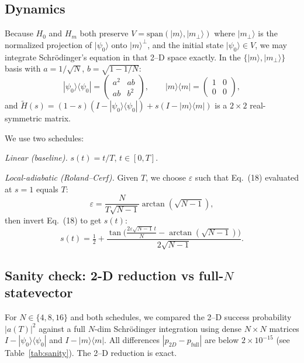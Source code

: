 \documentclass[11pt]{article}
\begin{document}
\subsection{Dynamics}

Because $H_0$ and $H_m$ both preserve $V=\mathrm{span}(|m\rangle,|m_\perp\rangle)$
where $|m_\perp\rangle$ is the normalized projection of $|\psi_0\rangle$ onto
$|m\rangle^\perp$, and the initial state $|\psi_0\rangle\in V$, we may integrate
Schr\"odinger's equation in that 2--D space exactly. In the
$\{|m\rangle,|m_\perp\rangle\}$ basis with $a=1/\sqrt N$, $b=\sqrt{1-1/N}$:
\[
  |\psi_0\rangle\langle\psi_0|=\begin{pmatrix}a^2 & ab\\ ab & b^2\end{pmatrix},\qquad
  |m\rangle\langle m|=\begin{pmatrix}1 & 0\\ 0 & 0\end{pmatrix},
\]
and $\tilde H(s)=(1-s)(I-|\psi_0\rangle\langle\psi_0|)+s(I-|m\rangle\langle m|)$
is a $2\times 2$ real-symmetric matrix.

We use two schedules:

\medskip
\emph{Linear (baseline).} $s(t)=t/T$, $t\in[0,T]$.

\medskip
\emph{Local-adiabatic (Roland--Cerf).} Given $T$, we choose $\varepsilon$
such that Eq.~(18) evaluated at $s=1$ equals $T$:
\[
  \varepsilon=\frac{N}{T\sqrt{N-1}}\arctan(\sqrt{N-1}),
\]
then invert Eq.~(18) to get $s(t)$:
\[
  s(t)=\tfrac{1}{2}+\frac{\tan\!\big(\tfrac{2\varepsilon\sqrt{N-1}\,t}{N}-\arctan(\sqrt{N-1})\big)}{2\sqrt{N-1}}.
\]

\subsection{Sanity check: 2-D reduction vs full-$N$ statevector}

For $N\in\{4,8,16\}$ and both schedules, we compared the 2--D success probability
$|a(T)|^2$ against a full $N$-dim Schr\"odinger integration using dense
$N\times N$ matrices $I-|\psi_0\rangle\langle\psi_0|$ and $I-|m\rangle\langle m|$.
All differences $|p_{2D}-p_{\text{full}}|$ are below $2\times 10^{-15}$
(see Table~\ref{tab:sanity}). The 2--D reduction is exact.
\end{document}
